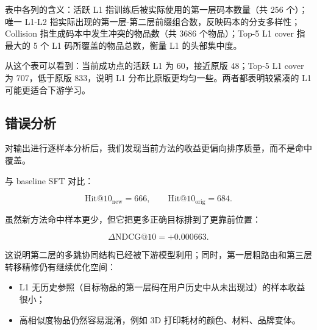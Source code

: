 \documentclass[11pt]{article}
\begin{document}
表中各列的含义：活跃 L1 指训练后被实际使用的第一层码本数量（共 256 个）；唯一 L1-L2 指实际出现的第一层-第二层前缀组合数，反映码本的分支多样性；Collision 指生成码本中发生冲突的物品数（共 3686 个物品）；Top-5 L1 cover 指最大的 5 个 L1 码所覆盖的物品总数，衡量 L1 的头部集中度。

从这个表可以看到：当前成功点的活跃 L1 为 60，接近原版 48；Top-5 L1 cover 为 707，低于原版 833，说明 L1 分布比原版更均匀一些。两者都表明较紧凑的 L1 可能更适合下游学习。

\subsection{错误分析}

对输出进行逐样本分析后，我们发现当前方法的收益更偏向排序质量，而不是命中覆盖。

与 baseline SFT 对比：

\[
\mathrm{Hit@10}_{\mathrm{new}} = 666,\qquad
\mathrm{Hit@10}_{\mathrm{orig}} = 684.
\]

虽然新方法命中样本更少，但它把更多正确目标排到了更靠前位置：

\[
\Delta \mathrm{NDCG@10}=+0.000663.
\]

这说明第二层的多跳协同结构已经被下游模型利用；同时，第一层粗路由和第三层转移精修仍有继续优化空间：

\begin{itemize}
  \item L1 无历史参照（目标物品的第一层码在用户历史中从未出现过）的样本收益很小；
  \item 高相似度物品仍然容易混淆，例如 3D 打印耗材的颜色、材料、品牌变体。
\end{itemize}
\end{document}
